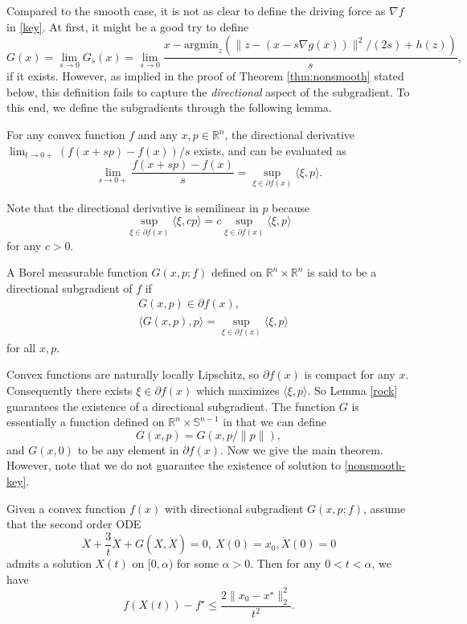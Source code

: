 \documentclass[twoside,11pt]{article}
\newcommand{\norm}[1]{\|#1\|}
\newcommand{\R}{\mathbb{R}}
\begin{document}
Compared to the smooth case, it is not as clear to define the driving force as $\nabla f$ in \eqref{key}. At first, it might be a good try to define
\[
G(x) = \underset{s\rightarrow 0}{\lim} G_s(x) = \underset{s\rightarrow 0}{\lim}\frac{x - \text{argmin}_z\left( \norm{z - (x - s\nabla g(x))}^2/(2s) + h(z) \right)}{s},
\]
if it exists. However, as implied in the proof of Theorem \ref{thm:nonsmooth} stated below, this definition fails to capture the \textit{directional} aspect of the subgradient. To this end, we define the subgradients through the following lemma.
\begin{lemma}\citep{rockafellar}\label{rock}
For any convex function $f$ and any $x, p \in \R^n$, the directional derivative 
$\lim_{t\rightarrow 0+}(f(x + sp) - f(x))/s $ exists, and can be evaluated as
$$\lim_{s\rightarrow 0+}\frac{f(x + sp) - f(x)}{s} = \sup_{\xi\in \partial f(x)}\langle \xi, p \rangle.$$
\end{lemma}
Note that the directional derivative is semilinear in $p$ because 
\[
\sup_{\xi\in \partial f(x)}\langle \xi, cp \rangle =  c\sup_{\xi\in \partial f(x)}\langle \xi, p \rangle
\]
for any $c>0$. 

\begin{definition}
A Borel measurable function $G(x, p;f)$ defined on $\mathbb{R}^n\times \mathbb{R}^{n}$ is said to be a directional subgradient of $f$ if 
\begin{align*}
&G(x, p) \in \partial f(x),\\
& \langle G(x, p), p\rangle = \sup_{\xi\in \partial f(x)}\langle \xi, p \rangle
\end{align*}
for all $x, p$.
\end{definition}

Convex functions are naturally locally Lipschitz, so $\partial f(x)$ is compact for any $x$. Consequently there exists $\xi \in \partial f(x)$ which maximizes $\langle \xi, p \rangle$. So Lemma \ref{rock} guarantees the existence of a directional subgradient. The function $G$ is essentially a function defined on $\mathbb{R}^n\times \mathbb{S}^{n-1}$ in that we can define
\[
G(x, p) = G(x, p/\norm{p}),
\]
and $G(x, 0)$ to be any element in $\partial f(x)$. Now we give the main theorem. However, note that we do not guarantee the existence of solution to \eqref{nonsmooth-key}.
\begin{theorem}\label{thm:nonsmooth}
Given a convex function $f(x)$ with directional subgradient $G(x, p;f)$, assume that the second order ODE
\begin{equation}\label{nonsmooth-key}
\ddot{X} + \frac{3}{t}\dot{X} + G(X, \dot X) = 0, ~ X(0) = x_0, \dot X(0) = 0
\end{equation}
admits a solution $X(t)$ on $[0, \alpha)$ for some $\alpha > 0$. Then for any $0 < t < \alpha$, we have
$$f(X(t)) - f^\star \le \frac{2\norm{x_0-x^\star}_2^2}{t^2}.$$
\end{theorem}
\end{document}
